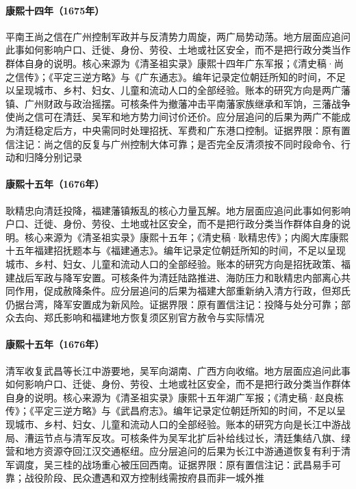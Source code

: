 \hypertarget{social:EQ-1675-SHANG-ZHIXIN}{}\paragraph{康熙十四年（1675年）}平南王尚之信在广州控制军政并与反清势力周旋，两广局势动荡。地方层面应追问此事如何影响户口、迁徙、身份、劳役、土地或社区安全，而不是把行政分类当作群体自身的说明。核心来源为《清圣祖实录》康熙十四年广东军报；《清史稿·尚之信传》；《平定三逆方略》与《广东通志》。编年记录定位朝廷所知的时间，不足以呈现城市、乡村、妇女、儿童和流动人口的全部经验。账本的研究方向是两广藩镇、广州财政与政治摇摆。可核条件为撤藩冲击平南藩家族继承和军饷，三藩战争使尚之信可在清廷、吴军和地方势力间讨价还价。应分层追问的后果为两广不能成为清廷稳定后方，中央需同时处理招抚、军费和广东港口控制。证据界限：原有置信注记：尚之信的反复与广州控制大体可靠；是否完全反清须按不同时段命令、行动和归降分别记录
\hypertarget{social:EQ-1676-GENG-SURRENDER}{}\paragraph{康熙十五年（1676年）}耿精忠向清廷投降，福建藩镇叛乱的核心力量瓦解。地方层面应追问此事如何影响户口、迁徙、身份、劳役、土地或社区安全，而不是把行政分类当作群体自身的说明。核心来源为《清圣祖实录》康熙十五年；《清史稿·耿精忠传》；内阁大库康熙十五年福建招抚题本与《福建通志》。编年记录定位朝廷所知的时间，不足以呈现城市、乡村、妇女、儿童和流动人口的全部经验。账本的研究方向是招抚政策、福建战后军政与降军安置。可核条件为清廷陆路推进、海防压力和耿精忠内部离心共同作用，促成赦降条件。应分层追问的后果为福建大部重新纳入清方行政，但郑氏仍据台湾，降军安置成为新风险。证据界限：原有置信注记：投降与处分可靠；部众去向、郑氏影响和福建地方恢复须区别官方赦令与实际情况
\hypertarget{social:EQ-1676-WUCHANG}{}\paragraph{康熙十五年（1676年）}清军收复武昌等长江中游要地，吴军向湖南、广西方向收缩。地方层面应追问此事如何影响户口、迁徙、身份、劳役、土地或社区安全，而不是把行政分类当作群体自身的说明。核心来源为《清圣祖实录》康熙十五年湖广军报；《清史稿·赵良栋传》；《平定三逆方略》与《武昌府志》。编年记录定位朝廷所知的时间，不足以呈现城市、乡村、妇女、儿童和流动人口的全部经验。账本的研究方向是长江中游战局、漕运节点与清军反攻。可核条件为吴军北扩后补给线过长，清廷集结八旗、绿营和地方资源夺回江汉交通枢纽。应分层追问的后果为长江中游通道恢复有利于清军调度，吴三桂的战场重心被压回西南。证据界限：原有置信注记：武昌易手可靠；战役阶段、民众遭遇和双方控制线需按府县而非一城外推

